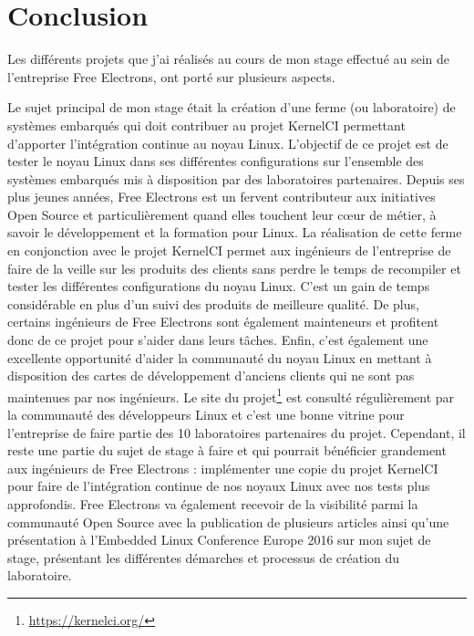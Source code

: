 \chapter{Conclusion}

Les différents projets que j'ai réalisés au cours de mon stage effectué au sein de l'entreprise Free Electrons, ont porté sur plusieurs aspects.

Le sujet principal de mon stage était la création d'une ferme (ou laboratoire) de systèmes embarqués qui doit contribuer au projet KernelCI permettant d'apporter l'intégration continue au noyau Linux. L'objectif de ce projet est de tester le noyau Linux dans ses différentes configurations sur l'ensemble des systèmes embarqués mis à disposition par des laboratoires partenaires. Depuis ses plus jeunes années, Free Electrons est un fervent contributeur aux initiatives Open Source et particulièrement quand elles touchent leur c\oe{}ur de métier, à savoir le développement et la formation pour Linux. La réalisation de cette ferme en conjonction avec le projet KernelCI permet aux ingénieurs de l'entreprise de faire de la veille sur les produits des clients sans perdre le temps de recompiler et tester les différentes configurations du noyau Linux. C'est un gain de temps considérable en plus d'un suivi des produits de meilleure qualité. De plus, certains ingénieurs de Free Electrons sont également mainteneurs et profitent donc de ce projet pour s'aider dans leurs tâches. Enfin, c'est également une excellente opportunité d'aider la communauté du noyau Linux en mettant à disposition des cartes de développement d'anciens clients qui ne sont pas maintenues par nos ingénieurs. Le site du projet\footnote{\url{https://kernelci.org/}} est consulté régulièrement par la communauté des développeurs Linux et c'est une bonne vitrine pour l'entreprise de faire partie des 10 laboratoires partenaires du projet. Cependant, il reste une partie du sujet de stage à faire et qui pourrait bénéficier grandement aux ingénieurs de Free Electrons : implémenter une copie du projet KernelCI pour faire de l'intégration continue de nos noyaux Linux avec nos tests plus approfondis. Free Electrons va également recevoir de la visibilité parmi la communauté Open Source avec la publication de plusieurs articles ainsi qu'une présentation à l'Embedded Linux Conference Europe 2016 sur mon sujet de stage, présentant les différentes démarches et processus de création du laboratoire.

